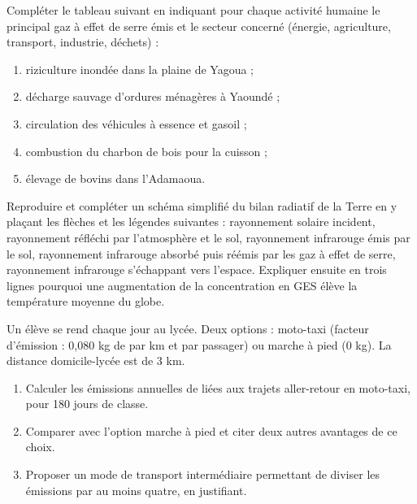 \documentclass[11pt]{article}
\begin{document}
\begin{exercice}
Compléter le tableau suivant en indiquant pour chaque activité humaine le principal gaz à effet de serre émis et le secteur concerné (énergie, agriculture, transport, industrie, déchets) :
\begin{enumerate}
\item riziculture inondée dans la plaine de Yagoua ;
\item décharge sauvage d'ordures ménagères à Yaoundé ;
\item circulation des véhicules à essence et gasoil ;
\item combustion du charbon de bois pour la cuisson ;
\item élevage de bovins dans l'Adamaoua.
\end{enumerate}
\end{exercice}

\begin{exercice}
Reproduire et compléter un schéma simplifié du bilan radiatif de la Terre en y plaçant les flèches et les légendes suivantes : rayonnement solaire incident, rayonnement réfléchi par l'atmosphère et le sol, rayonnement infrarouge émis par le sol, rayonnement infrarouge absorbé puis réémis par les gaz à effet de serre, rayonnement infrarouge s'échappant vers l'espace. Expliquer ensuite en trois lignes pourquoi une augmentation de la concentration en GES élève la température moyenne du globe.
\end{exercice}

\begin{exercice}
Un élève se rend chaque jour au lycée. Deux options : moto-taxi (facteur d'émission : 0,080 kg de  par km et par passager) ou marche à pied (0 kg). La distance domicile-lycée est de 3 km.
\begin{enumerate}
\item Calculer les émissions annuelles de  liées aux trajets aller-retour en moto-taxi, pour 180 jours de classe.
\item Comparer avec l'option marche à pied et citer deux autres avantages de ce choix.
\item Proposer un mode de transport intermédiaire permettant de diviser les émissions par au moins quatre, en justifiant.
\end{enumerate}
\end{exercice}
\end{document}

